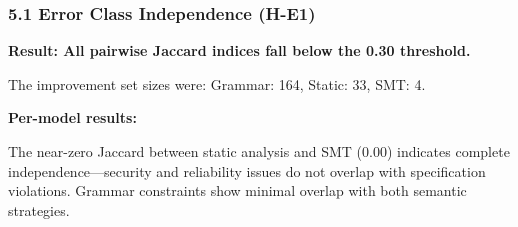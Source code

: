 
\subsubsection{5.1 Error Class Independence (H-E1)}

\textbf{Result: All pairwise Jaccard indices fall below the 0.30 threshold.}

\begin{table}[htbp]
\centering
{}
\end{table}

The improvement set sizes were: Grammar: 164, Static: 33, SMT: 4.

\textbf{Per-model results:}

\begin{table}[htbp]
\centering
{}
\end{table}

The near-zero Jaccard between static analysis and SMT (0.00) indicates complete independence---security and reliability issues do not overlap with specification violations. Grammar constraints show minimal overlap with both semantic strategies.


